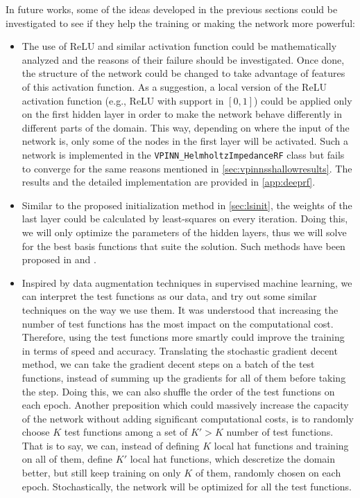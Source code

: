 In future works, some of the ideas developed in the previous sections could be investigated to see if they help the training or making the network more powerful:
\begin{itemize}
    \item The use of ReLU and similar activation function could be mathematically analyzed and the reasons of their failure should be investigated. Once done, the structure of the network could be changed to take advantage of features of this activation function. As a suggestion, a local version of the ReLU activation function (e.g., ReLU with support in $[0, 1]$) could be applied only on the first hidden layer in order to make the network behave differently in different parts of the domain. This way, depending on where the input of the network is, only some of the nodes in the first layer will be activated. Such a network is implemented in the \texttt{VPINN\_HelmholtzImpedanceRF} class but fails to converge for the same reasons mentioned in \autoref{sec:vpinnsshallowresults}. The results and the detailed implementation are provided in \autoref{app:deeprf}.

    \item Similar to the proposed initialization method in \autoref{sec:lsinit}, the weights of the last layer could be calculated by least-squares on every iteration. Doing this, we will only optimize the parameters of the hidden layers, thus we will solve for the best basis functions that suite the solution. Such methods have been proposed in \cite{cyr2019} and \cite{liu2021}.

    \item Inspired by data augmentation techniques in supervised machine learning, we can interpret the test functions as our data, and try out some similar techniques on the way we use them. It was understood that increasing the number of test functions has the most impact on the computational cost. Therefore, using the test functions more smartly could improve the training in terms of speed and accuracy. Translating the stochastic gradient decent method, we can take the gradient decent steps on a batch of the test functions, instead of summing up the gradients for all of them before taking the step. Doing this, we can also shuffle the order of the test functions on each epoch. Another preposition which could massively increase the capacity of the network without adding significant computational costs, is to randomly choose $K$ test functions among a set of $K'>K$ number of test functions. That is to say, we can, instead of defining $K$ local hat functions and training on all of them, define $K'$ local hat functions, which descretize the domain better, but still keep training on only $K$ of them, randomly chosen on each epoch. Stochastically, the network will be optimized for all the test functions.


\end{itemize}
